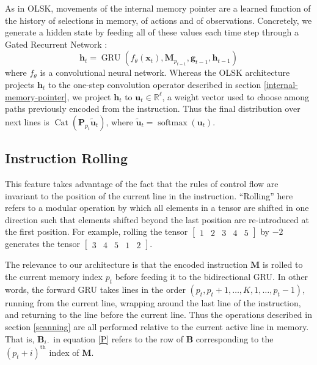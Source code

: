 \documentclass{article}
\DeclareMathOperator{\GRU}{GRU}
\DeclareMathOperator{\Cat}{Cat}
\DeclareMathOperator{\softmax}{softmax}
\begin{document}
As in OLSK, movements of the internal memory pointer are a learned
function of the history of selections in memory, of actions and of observations.
Concretely, we generate a hidden state by feeding all of these values each time
step through a Gated Recurrent Network \citet{ChoMGBSB14}:
\begin{equation}
  \label{gru}
  \mathbf{h}_t = \GRU\left(f_\theta\left(\mathbf{x}_t\right),
    \mathbf{M}_{p_{t-1}}, \mathbf{g}_{t-1},
  \mathbf{h}_{t-1}\right)
\end{equation}
where $f_\theta$ is a convolutional neural network. Whereas the
OLSK architecture
projects $\mathbf{h}_{t}$ to the one-step convolution operator described in
section \ref{internal-memory-pointer}, we project $\mathbf{h}_t$ to $\mathbf{u}_t\in \mathbb{R}^\ell$, a weight vector
used to choose among paths previously encoded from the instruction. Thus the final
distribution over next lines is
$\Cat(\mathbf{P}_{p_t}\tilde{\mathbf{u}}_t)$, where $\tilde{\mathbf{u}}_t =
\softmax\left(\mathbf{u}_t\right)$.


\subsection{Instruction Rolling}
\label{rolling}
This feature takes advantage of the fact that the rules of control flow are
invariant to the position of the current line in the instruction. ``Rolling'' here
refers to a modular operation by which all elements in a tensor are shifted in
one direction such that elements shifted beyond the last position are
re-introduced at the first position. For example, rolling the tensor 
$\begin{bmatrix} 1 & 2 & 3 & 4 & 5 \end{bmatrix}$ by $-2$ generates the tensor
$\begin{bmatrix} 3 & 4 & 5 & 1 & 2 \end{bmatrix}$. 

The relevance to our architecture is that the encoded instruction $\mathbf{M}$ is rolled to the current memory index
$p_t$ before feeding it to the bidirectional GRU. In other words, the forward GRU takes lines in the
order $(p_t, p_t + 1, \dots, K, 1, \dots, p_t - 1)$, running from the current
line, wrapping around the last line of the instruction, and returning to the line
before the current line. Thus the operations described in section \ref{scanning} are all performed
relative to the current active line in memory. That is, $\mathbf{B}_{i\cdot}$ in
equation \ref{P} refers to the row of $\mathbf{B}$ corresponding to the $(p_t +
i)^{\text{th}}$ index of $\mathbf{M}$.
\end{document}
